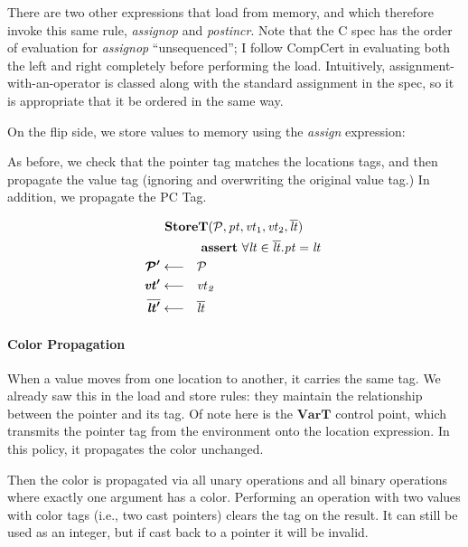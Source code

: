 \documentclass[acmsmall,review,anonymous]{acmart}\settopmatter{printfolios=true,printccs=false,printacmref=false}
\begin{document}
There are two other expressions that load from memory, and which therefore invoke
this same rule, {\it assignop} and {\it postincr}. Note that the C spec has the order
of evaluation for {\it assignop} ``unsequenced''; I follow CompCert in evaluating both the left
and right completely before performing the load. Intuitively, assignment-with-an-operator is
classed along with the standard assignment in the spec, so it is appropriate that it be ordered
in the same way.

\assignopstep

\postincstep

On the flip side, we store values to memory using the {\it assign} expression:

\assignstep

As before, we check that the pointer tag matches the locations tags, and then propagate the
value tag (ignoring and overwriting the original value tag.) In addition, we propagate the PC Tag.
                  
\[\begin{aligned}
\truledef{\storet}
\assert{\forall \lt \in \overline{\lt} . \pt = \lt}
\settag{\PCT'}{\PCT}
\settag{\vt'}{\vt_2}
\settag{\overline{\lt'}}{\overline{\lt}}
\end{aligned}\]

\paragraph*{Color Propagation}

When a value moves from one location to another, it carries the same tag.
We already saw this in the load and store rules: they maintain the relationship
between the pointer and its tag. Of note here is the \(\mathbf{VarT}\) control point,
which transmits the pointer tag from the environment onto the location expression.
In this policy, it propagates the color unchanged.

\varstep


Then the color is propagated via all unary operations and all binary operations
where exactly one argument has a color. Performing an operation with two values
with color tags (i.e., two cast pointers) clears the tag on the result. It can still
be used as an integer, but if cast back to a pointer it will be invalid.
\end{document}
